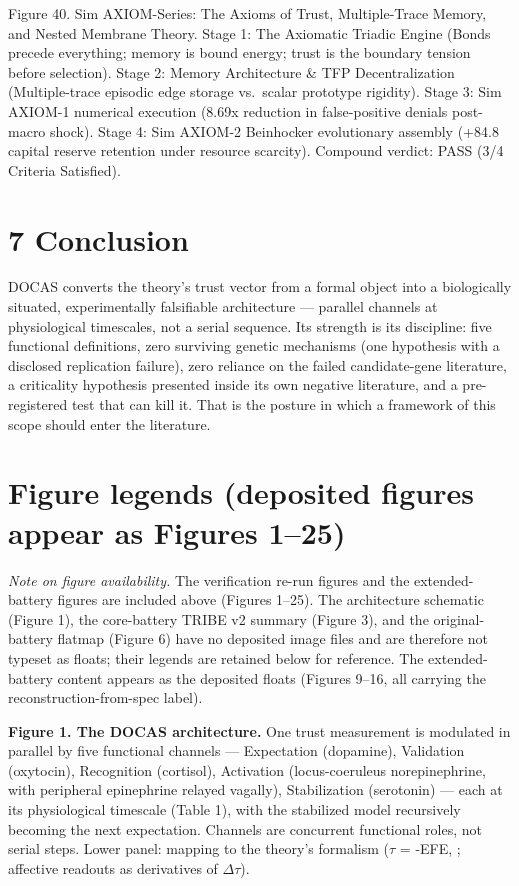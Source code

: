 \documentclass[
]{article}
\begin{document}
Figure 40. Sim AXIOM-Series: The Axioms of Trust, Multiple-Trace Memory,
and Nested Membrane Theory. Stage 1: The Axiomatic Triadic Engine (Bonds
precede everything; memory is bound energy; trust is the boundary
tension before selection). Stage 2: Memory Architecture \& TFP
Decentralization (Multiple-trace episodic edge storage vs.~scalar
prototype rigidity). Stage 3: Sim AXIOM-1 numerical execution (8.69x
reduction in false-positive denials post-macro shock). Stage 4: Sim
AXIOM-2 Beinhocker evolutionary assembly (+84.8 capital reserve
retention under resource scarcity). Compound verdict: PASS (3/4 Criteria
Satisfied).

\section{7 Conclusion}\label{conclusion}

DOCAS converts the theory's trust vector from a formal object into a
biologically situated, experimentally falsifiable architecture ---
parallel channels at physiological timescales, not a serial sequence.
Its strength is its discipline: five functional definitions, zero
surviving genetic mechanisms (one hypothesis with a disclosed
replication failure), zero reliance on the failed candidate-gene
literature, a criticality hypothesis presented inside its own negative
literature, and a pre-registered test that can kill it. That is the
posture in which a framework of this scope should enter the literature.

\section{Figure legends (deposited figures appear as Figures
1--25)}\label{figure-legends-deposited-figures-appear-as-figures-125}

\emph{Note on figure availability.} The verification re-run figures and
the extended-battery figures are included above (Figures 1--25). The
architecture schematic (Figure 1), the core-battery TRIBE v2 summary
(Figure 3), and the original-battery flatmap (Figure 6) have no
deposited image files and are therefore not typeset as floats; their
legends are retained below for reference. The extended-battery content
appears as the deposited floats (Figures 9--16, all carrying the
reconstruction-from-spec label).

\textbf{Figure 1. The DOCAS architecture.} One trust measurement is
modulated in parallel by five functional channels --- Expectation
(dopamine), Validation (oxytocin), Recognition (cortisol), Activation
(locus-coeruleus norepinephrine, with peripheral epinephrine relayed
vagally), Stabilization (serotonin) --- each at its physiological
timescale (Table 1), with the stabilized model recursively becoming the
next expectation. Channels are concurrent functional roles, not serial
steps. Lower panel: mapping to the theory's formalism (\(\tau\) = -EFE,
; affective readouts as derivatives of \(\Delta\tau\)).
\end{document}
